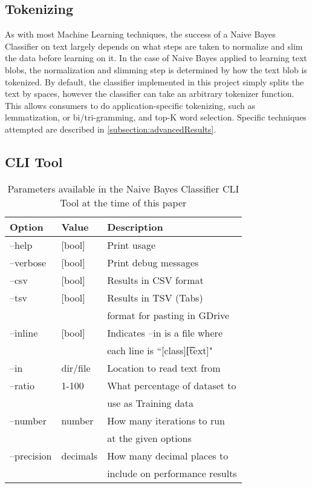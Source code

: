 \subsection{Tokenizing}
\label{subsection:tokenizing}
As with most Machine Learning techniques, the success of a Naive Bayes Classifier on text largely depends on what steps
are taken to normalize and slim the data before learning on it. In the case of Naive Bayes applied to learning text
blobs, the normalization and slimming step is determined by how the text blob is tokenized. By default, the classifier
implemented in this project simply splits the text by spaces, however the classifier can take an arbitrary tokenizer
function. This allows consumers to do application-specific tokenizing, such as lemmatization, or bi/tri-gramming, and
top-K word selection. Specific techniques attempted are described in \ref{subsection:advancedResults}.

\subsection{CLI Tool}
\label{subsection:cliTool}

\begin{table}
    \begin{tabular}{lll}
        \hline
        \textbf{Option} & \textbf{Value} & \textbf{Description} \\ [0.5ex]
        \hline\hline
        --help & [bool] & Print usage \\
        --verbose & [bool] & Print debug messages \\
        --csv & [bool] & Results in CSV format \\
        --tsv & [bool] & Results in TSV (Tabs) \\
              &        & format for pasting in GDrive \\
        --inline & [bool] & Indicates --in is a file where \\
                 &        & each line is ``[class]\t[text]" \\
        --in & dir/file & Location to read text from \\
        --ratio & 1-100 & What percentage of dataset to \\
                &       & use as Training data \\
        --number & number & How many iterations to run \\
                 &        & at the given options \\
        --precision & decimals & How many decimal places to \\
                    &          & include on performance results \\
        \hline
    \end{tabular}
    \caption{Parameters available in the Naive Bayes Classifier CLI Tool at the time of this paper}
    \label{table:cliParams}
\end{table}

